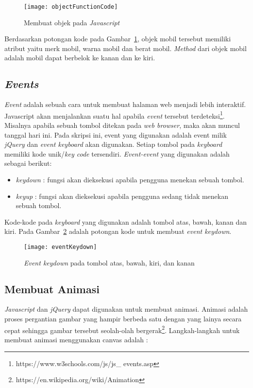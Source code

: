 \begin{figure}[H]
	\centering  
	\texttt{[image: objectFunctionCode]}
	\caption[Membuat objek pada \textit{Javascript}]{Membuat objek pada \textit{Javascript}}
	\label{fig:objectFunctionCode} 
\end{figure} 

Berdasarkan potongan kode pada Gambar~\ref{fig:objectFunctionCode}, objek mobil tersebut memiliki atribut yaitu merk mobil, warna mobil dan berat mobil. \textit{Method} dari objek mobil adalah mobil dapat berbelok ke kanan dan ke kiri.

\subsection{\textit{Events}}
\textit{Event} adalah sebuah cara untuk membuat halaman web menjadi lebih interaktif. Javascript akan menjalankan suatu hal apabila \textit{event} tersebut terdeteksi\footnote{https://www.w3schools.com/js/js\_ events.asp}. Misalnya apabila sebuah tombol ditekan pada \textit{web browser}, maka akan muncul tanggal hari ini.  Pada skripsi ini, event yang digunakan adalah event milik \textit{jQuery} dan \textit{event keyboard} akan digunakan. Setiap tombol pada \textit{keyboard} memiliki kode unik/\textit{key code} tersendiri. \textit{Event-event} yang digunakan adalah sebagai berikut:

\begin{itemize}
	\item \textit{keydown} : fungsi akan dieksekusi apabila pengguna menekan sebuah tombol.
	\item \textit{keyup} : fungsi akan dieksekusi apabila pengguna sedang tidak menekan sebuah tombol.
\end{itemize}

Kode-kode pada \textit{keyboard} yang digunakan adalah tombol atas, bawah, kanan dan kiri. Pada Gambar~\ref{fig:eventKeyDown} adalah potongan kode untuk membuat \textit{event keydown}.

\begin{figure}[H]
	\centering  
	\texttt{[image: eventKeydown]}
	\caption[\textit{Event keydown} pada tombol atas, bawah, kiri, dan kanan]{\textit{Event keydown} pada tombol atas, bawah, kiri, dan kanan}
	\label{fig:eventKeyDown} 
\end{figure} 

\subsection{Membuat Animasi}
\textit{Javascript} dan \textit{jQuery} dapat digunakan untuk membuat animasi. Animasi adalah proses pergantian gambar yang hampir berbeda satu dengan yang lainya secara cepat sehingga gambar tersebut seolah-olah bergerak\footnote{https://en.wikipedia.org/wiki/Animation}. Langkah-langkah untuk membuat animasi menggunakan canvas adalah :

